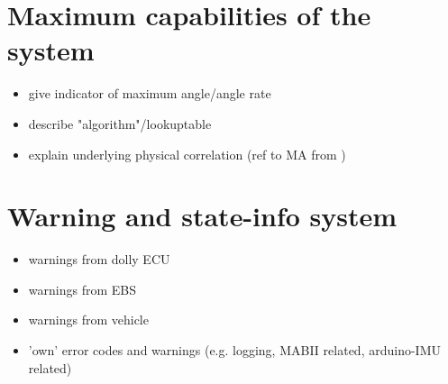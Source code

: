 \documentclass[ExampleMasters.tex]{subfiles}
\begin{document}
\section{Maximum capabilities of the system}
\label{sec:maxi_capabilities}
\begin{itemize}
	\item give indicator of maximum angle/angle rate
	\item describe "algorithm"/lookuptable
	\item explain underlying physical correlation (ref to MA from )
\end{itemize}

\section{Warning and state-info system}
\label{sec:warning_system}
\begin{itemize}
	\item warnings from dolly ECU
	\item warnings from EBS
	\item warnings from vehicle
	\item 'own' error codes and warnings (e.g. logging, MABII related, arduino-IMU related)
\end{itemize}
\end{document}
